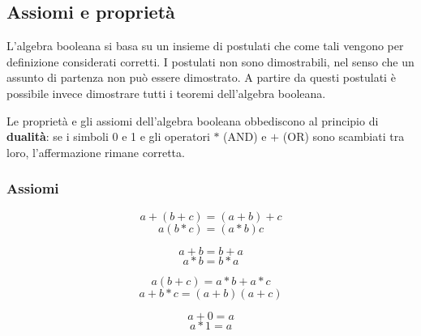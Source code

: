\subsection{Assiomi e proprietà}
L’algebra booleana si basa su un insieme di postulati che come tali vengono per definizione considerati corretti. I postulati non sono dimostrabili, nel senso che un assunto di partenza non può essere dimostrato. A partire da questi postulati è possibile invece dimostrare tutti i teoremi dell’algebra booleana.

Le proprietà e gli assiomi dell’algebra booleana obbediscono al principio di \textbf{dualità}: se i simboli 0 e 1 e gli operatori $*$ (AND) e $+$ (OR) sono scambiati tra loro, l’affermazione rimane corretta.

\subsubsection*{Assiomi}
\begin{definition}[Associatività]
    \begin{equation}
        a+(b+c)=(a+b)+c
    \end{equation}
    \begin{equation*}
        a(b*c)=(a*b)c
    \end{equation*}
\end{definition}

\begin{definition}[Commutatività]
    \begin{equation}
        a+b=b+a
    \end{equation}
    \begin{equation*}
        a*b=b*a
    \end{equation*}
\end{definition}

\begin{definition}[Distributività]
    \begin{equation}
        a(b+c)=a*b+a*c
    \end{equation}
    \begin{equation*}
        a+b*c=(a+b)(a+c)
    \end{equation*}
\end{definition}

\begin{definition}
    \begin{equation}
        a+0=a
    \end{equation}
    \begin{equation*}
        a*1=a
    \end{equation*}
\end{definition}

